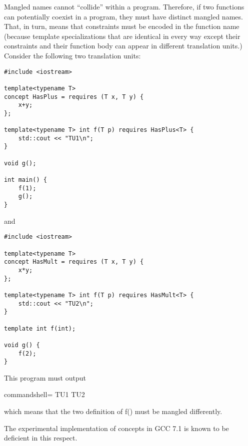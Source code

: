 Mangled names cannot “collide” within a program. Therefore, if two functions can potentially coexist in a program, they must have distinct mangled names. That, in turn, means that constraints must be encoded in the function name (because template specializations that are identical in every way except their constraints and their function body can appear in different translation units.) Consider the following two translation units:

\begin{lstlisting}[style=styleCXX]
#include <iostream>

template<typename T>
concept HasPlus = requires (T x, T y) {
	x+y;
};

template<typename T> int f(T p) requires HasPlus<T> {
	std::cout << "TU1\n";
}

void g();

int main() {
	f(1);
	g();
}
\end{lstlisting}

and

\begin{lstlisting}[style=styleCXX]
#include <iostream>

template<typename T>
concept HasMult = requires (T x, T y) {
	x*y;
};

template<typename T> int f(T p) requires HasMult<T> {
	std::cout << "TU2\n";
}

template int f(int);

void g() {
	f(2);
}
\end{lstlisting}

This program must output

\begin{tcblisting}{commandshell={}}
TU1
TU2
\end{tcblisting}

which means that the two definition of f() must be mangled differently.

\begin{tcolorbox}[colback=webgreen!5!white,colframe=webgreen!75!black]
\hspace*{0.75cm}The experimental implementation of concepts in GCC 7.1 is known to be deficient in this respect.
\end{tcolorbox}























